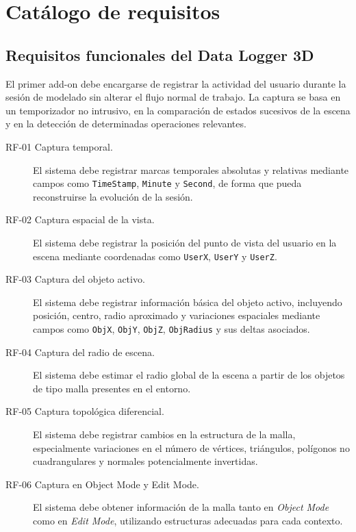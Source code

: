 \section{Catálogo de requisitos}

\subsection{Requisitos funcionales del Data Logger 3D}

El primer add-on debe encargarse de registrar la actividad del usuario durante la sesión de modelado sin alterar el flujo normal de trabajo. La captura se basa en un temporizador no intrusivo, en la comparación de estados sucesivos de la escena y en la detección de determinadas operaciones relevantes.

\begin{description}
    \item[RF-01 Captura temporal.] El sistema debe registrar marcas temporales absolutas y relativas mediante campos como \texttt{TimeStamp}, \texttt{Minute} y \texttt{Second}, de forma que pueda reconstruirse la evolución de la sesión.

    \item[RF-02 Captura espacial de la vista.] El sistema debe registrar la posición del punto de vista del usuario en la escena mediante coordenadas como \texttt{UserX}, \texttt{UserY} y \texttt{UserZ}.

    \item[RF-03 Captura del objeto activo.] El sistema debe registrar información básica del objeto activo, incluyendo posición, centro, radio aproximado y variaciones espaciales mediante campos como \texttt{ObjX}, \texttt{ObjY}, \texttt{ObjZ}, \texttt{ObjRadius} y sus deltas asociados.

    \item[RF-04 Captura del radio de escena.] El sistema debe estimar el radio global de la escena a partir de los objetos de tipo malla presentes en el entorno.

    \item[RF-05 Captura topológica diferencial.] El sistema debe registrar cambios en la estructura de la malla, especialmente variaciones en el número de vértices, triángulos, polígonos no cuadrangulares y normales potencialmente invertidas.

    \item[RF-06 Captura en Object Mode y Edit Mode.] El sistema debe obtener información de la malla tanto en \textit{Object Mode} como en \textit{Edit Mode}, utilizando estructuras adecuadas para cada contexto.


\end{description}

